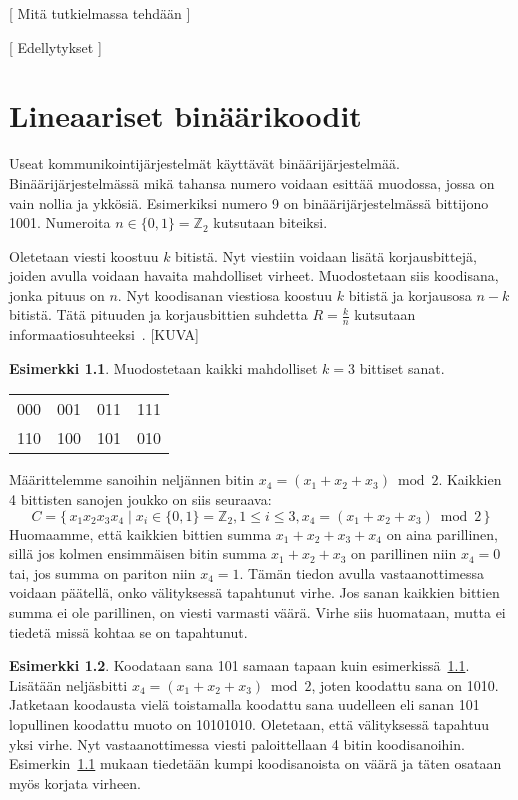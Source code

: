 \documentclass[a4paper,12pt,leqno,oneside]{report} %
\theoremstyle{plain}
\theoremstyle{definition}
\newtheorem{esimerkki}{Esimerkki}[chapter]
\theoremstyle{remark}
\numberwithin{equation}{chapter}
\newcommand*{\Zset}{\mathbb{Z}}  %
\begin{document}
    [ Mitä tutkielmassa tehdään ]


    [ Edellytykset ]

    \chapter{Lineaariset binäärikoodit}\label{ch: Lineaariset binäärikoodit}

    Useat kommunikointijärjestelmät käyttävät binäärijärjestelmää. Binäärijärjestelmässä mikä tahansa numero voidaan esittää muodossa, jossa on vain nollia ja ykkösiä. Esimerkiksi numero 9 on binäärijärjestelmässä bittijono 1001. Numeroita 
    $n \in \{ 0, 1 \} = \Zset_2$ kutsutaan biteiksi.

    Oletetaan viesti koostuu $k$ bitistä. Nyt viestiin voidaan lisätä korjausbittejä, joiden avulla voidaan havaita mahdolliset virheet. Muodostetaan siis koodisana, jonka pituus on $n$. Nyt koodisanan viestiosa koostuu $k$ bitistä ja korjausosa $n-k$ bitistä. Tätä pituuden ja korjausbittien suhdetta $R = \frac{k}{n}$ kutsutaan informaatiosuhteeksi~\cite[s.~267]{GW}.
    [KUVA]
    \begin{esimerkki}\label{esim:3bitsanat}
        Muodostetaan kaikki mahdolliset $k = 3$ bittiset sanat.
        \begin{center}
            \begin{tabular}[t]{llll}
                000 & 001 & 011 & 111 \\
                110 & 100 & 101 & 010 \\
            \end{tabular}
        \end{center}
        Määrittelemme sanoihin neljännen bitin 
        $x_4 = (x_1 + x_2 + x_3) \bmod2$. Kaikkien 4 bittisten sanojen joukko on siis seuraava:
        \[
            C = \{\, x_1x_2x_3x_4 \mid  x_i \in \{0,1\} = \Zset_2, 1 \le i \le 3, x_4 = (x_1 + x_2 + x_3) \bmod2\,\}
        \]
        Huomaamme, että kaikkien bittien summa $x_1 + x_2 + x_3 + x_4$ on aina parillinen, sillä jos kolmen ensimmäisen bitin summa $x_1 + x_2 + x_3$ on parillinen niin $x_4 = 0$ tai, jos summa on pariton niin $x_4 = 1$.
        Tämän tiedon avulla vastaanottimessa voidaan päätellä, onko välityksessä tapahtunut virhe. Jos sanan kaikkien bittien summa ei ole parillinen, on viesti varmasti väärä. Virhe siis huomataan, mutta ei tiedetä missä kohtaa se on tapahtunut.
    \end{esimerkki}
    \begin{esimerkki}\label{esim:3bitsanatjatko}
        Koodataan sana 101 samaan tapaan kuin 
        esimerkissä~\ref{esim:3bitsanat}. Lisätään neljäsbitti $x_4 = (x_1 + x_2 + x_3) \bmod2$, joten koodattu sana on 1010. Jatketaan koodausta vielä toistamalla koodattu sana uudelleen eli sanan 101 lopullinen koodattu muoto on 10101010. Oletetaan, että välityksessä tapahtuu yksi virhe. Nyt vastaanottimessa viesti paloittellaan 4 bitin koodisanoihin. Esimerkin~\ref{esim:3bitsanat} mukaan tiedetään kumpi koodisanoista on väärä ja täten osataan myös korjata virheen.
    \end{esimerkki}
\end{document}
